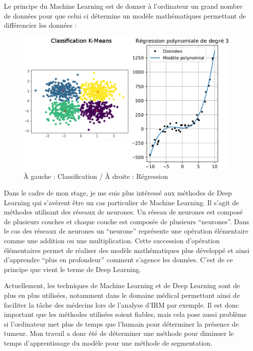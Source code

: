 \documentclass{book}
\newcommand{\p}{\vspace{0.2cm}}
\begin{document}
		Le principe du Machine Learning est de donner à l'ordinateur un grand nombre de données pour que celui ci détermine un modèle mathématiques permettant de différencier les données :
		\begin{figure}
			\begin{center}
				\includegraphics[scale = 0.5]{annex/ex_mach_lr}
				\caption[Exemple de Machine Learning]{\`A gauche : Classification / \`A droite : Régression}
				\label{example}
			\end{center}
		\end{figure}\p

		Dans le cadre de mon stage, je me suis plus intéressé aux méthodes de Deep Learning qui s'avèrent être un cas particulier de Machine Learning. Il s'agit de méthodes utilisant des réseaux de neurones. Un réseau de neurones est composé de plusieurs couches et chaque couche est composée de plusieurs ``neurones''. Dans le cas des réseaux de neurones un ``neurone'' représente une opération élémentaire comme une addition ou une multiplication. Cette succession d'opération élémentaires permet de réaliser des modèle mathématiques plus développé et ainsi d'apprendre ``plus en profondeur'' comment s'agence les données. C'est de ce principe que vient le terme de Deep Learning.\p

		Actuellement, les techniques de Machine Learning et de Deep Learning sont de plus en plus utilisées, notamment dans le domaine médical permettant ainsi de faciliter la tâche des médecins lors de l'analyse d'IRM par exemple. Il est donc important que les méthodes utilisées soient fiables, mais cela pose aussi problème si l'ordinateur met plus de temps que l'humain pour déterminer la présence de tumeur. Mon travail a donc été de déterminer une méthode pour diminuer le temps d'apprentissage du modèle pour une méthode de segmentation.\p
\end{document}
